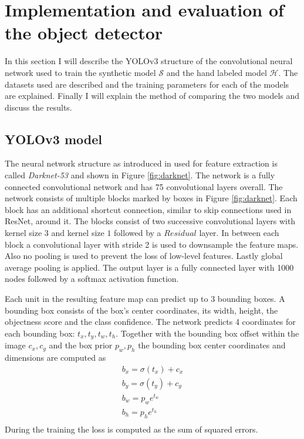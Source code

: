 \section{Implementation and evaluation of the object detector}

In this section I will describe the YOLOv3 structure of the convolutional neural network used to train the synthetic model $\mathcal{S}$ and the hand labeled model $\mathcal{H}$.
The datasets used are described and the training parameters for each of the models are explained.
Finally I will explain the method of comparing the two models and discuss the results.

\subsection{YOLOv3 model}
The neural network structure as introduced in \cite{redmon2018yolov3} used for feature extraction is called \textit{Darknet-53} and shown in Figure \ref{fig:darknet}.
The network is a fully connected convolutional network and has 75 convolutional layers overall.
The network consists of multiple blocks marked by boxes in Figure \ref{fig:darknet}.
Each block has an additional shortcut connection, similar to skip connections used in ResNet, around it.
The blocks consist of two successive convolutional layers with kernel size $3$ and kernel size $1$ followed by a $Residual$ layer.
In between each block a convolutional layer with stride 2 is used to downsample the feature maps.
Also no pooling is used to prevent the loss of low-level features.
Lastly global average pooling is applied.
The output layer is a fully connected layer with 1000 nodes followed by a softmax activation function.

Each unit in the resulting feature map can predict up to 3 bounding boxes.
A bounding box consists of the box's center coordinates, its width, height, the objectness score and the class confidence.
The network predicts 4 coordinates for each bounding box: $t_x, t_y, t_w, t_h$.
Together with the bounding box offset within the image $c_x, c_y$ and the box prior $p_w, p_h$ the bounding box center coordinates and dimensions are computed as
\begin{equation}
\begin{split}
b_x = \sigma(t_x) + c_x\\
b_y = \sigma(t_y) + c_y\\
b_w = p_we^{t_w}\\
b_h = p_he^{t_h}\\
\end{split}
\end{equation}
During the training the loss is computed as the sum of squared errors.

